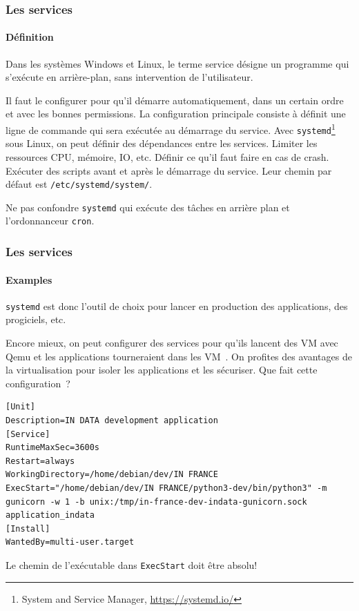 \documentclass{beamer}
\begin{document}
    \begin{frame}
        \transdissolve
        \frametitle{Les services}
        \framesubtitle{Définition}
        Dans les systèmes Windows et Linux, le terme service désigne un programme qui s'exécute en arrière-plan, sans intervention de l'utilisateur.

        Il faut le configurer pour qu'il démarre automatiquement, dans un certain ordre et avec les bonnes permissions.
        \bigbreak
        La configuration principale consiste à définit une ligne de commande qui sera exécutée au démarrage du service.
        \bigbreak
        Avec \lstinline{systemd}\footnote{System and Service Manager, \url{https://systemd.io/}} sous Linux, on peut définir des dépendances entre les services.
        Limiter les ressources CPU, mémoire, IO, etc.
        Définir ce qu'il faut faire en cas de crash.
        Exécuter des scripts avant et après le démarrage du service.
        \bigbreak
        Leur chemin par défaut est \lstinline{/etc/systemd/system/}.
        \begin{dangercolorbox}
            Ne pas confondre \lstinline{systemd} qui exécute des tâches en arrière plan et l'ordonnanceur \lstinline{cron}.
        \end{dangercolorbox}
    \end{frame}

    \begin{frame}[fragile]
        \transdissolve
        \frametitle{Les services}
        \framesubtitle{Examples}
        \lstinline{systemd} est donc l'outil de choix pour lancer en production des applications, des progiciels, etc.

        Encore mieux, on peut configurer des services pour qu'ils lancent des VM avec Qemu et les applications tourneraient dans les VM~.
        On profites des avantages de la virtualisation pour isoler les applications et les sécuriser.
        \bigbreak
        Que fait cette configuration~?
        \begin{lstlisting}
[Unit]
Description=IN DATA development application
[Service]
RuntimeMaxSec=3600s
Restart=always
WorkingDirectory=/home/debian/dev/IN FRANCE
ExecStart="/home/debian/dev/IN FRANCE/python3-dev/bin/python3" -m gunicorn -w 1 -b unix:/tmp/in-france-dev-indata-gunicorn.sock application_indata
[Install]
WantedBy=multi-user.target
        \end{lstlisting}
        \begin{dangercolorbox}
            Le chemin de l'exécutable dans \lstinline{ExecStart} doit être absolu!
        \end{dangercolorbox}
    \end{frame}
\end{document}
